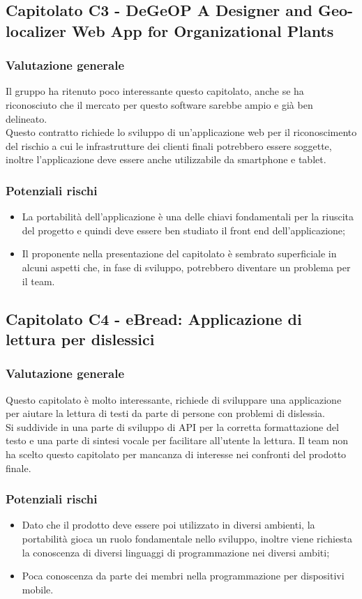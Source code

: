 \documentclass[12pt,a4paper,titlepage]{article}
\begin{document}
\subsection{Capitolato C3 - DeGeOP A Designer and Geo-localizer Web App for Organizational Plants}
\subsubsection{Valutazione generale}
Il gruppo ha ritenuto poco interessante questo capitolato, anche se ha riconosciuto che il mercato per questo software sarebbe ampio e già ben delineato. \\
Questo contratto richiede lo sviluppo di un'applicazione web per il riconoscimento del rischio a cui le infrastrutture dei clienti finali potrebbero essere soggette, inoltre l'applicazione deve essere anche utilizzabile da smartphone e tablet.
\subsubsection{Potenziali rischi}
\begin{itemize}
	\item La portabilità dell'applicazione è una delle chiavi fondamentali per la riuscita del progetto e quindi deve essere ben studiato il front end dell'applicazione;
	\item  Il proponente nella presentazione del capitolato è sembrato superficiale in alcuni aspetti che, in fase di sviluppo, potrebbero diventare un problema per il team.
\end{itemize}

\subsection{Capitolato C4 - eBread: Applicazione di lettura per dislessici}
\subsubsection{Valutazione generale}
Questo capitolato è molto interessante, richiede di sviluppare una applicazione per aiutare la lettura di testi da parte di persone con problemi di dislessia.\\ 
Si suddivide in una parte di sviluppo di API per la corretta formattazione del testo e una parte di sintesi vocale per facilitare all'utente la lettura. Il team non ha scelto questo capitolato per mancanza di interesse nei confronti del prodotto finale.
\subsubsection{Potenziali rischi}
\begin{itemize}
	\item Dato che il prodotto deve essere poi utilizzato in diversi ambienti, la portabilità gioca un ruolo fondamentale nello sviluppo, inoltre viene richiesta la conoscenza di diversi linguaggi di programmazione nei diversi ambiti;
	\item Poca conoscenza da parte dei membri nella programmazione per dispositivi mobile.
\end{itemize}
\end{document}
